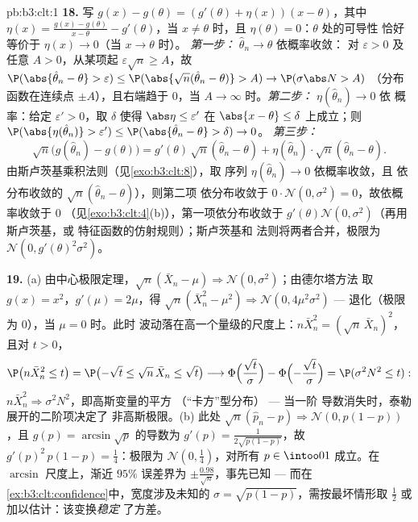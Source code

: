 \begin{solution}{pb:b3:clt:1}
\textbf{18.} 写 $g(x) - g(\theta) = (g'(\theta) +
\eta(x))(x - \theta)$，其中 $\eta(x) = \frac{g(x) -
g(\theta)}{x - \theta} - g'(\theta)$，当 $x \neq \theta$
时，且 $\eta(\theta) = 0$：$\theta$ 处的可导性
恰好等价于 $\eta(x) \to 0$（当 $x \to \theta$ 时）。
\emph{第一步：} $\hat\theta_n \to \theta$ 依概率收敛：
对 $\varepsilon > 0$ 及任意 $A > 0$，从某项起
$\varepsilon\sqrt n \geq A$，故 $\P(\abs{\hat\theta_n -
\theta} > \varepsilon) \leq \P(\abs{\sqrt
n(\hat\theta_n - \theta)} > A) \to \P(\sigma\abs N > A)$
（分布函数在连续点
$\pm A$），且右端趋于 $0$，当 $A \to
\infty$ 时。\emph{第二步：} $\eta(\hat\theta_n) \to 0$ 依
概率：给定 $\varepsilon' > 0$，取 $\delta$ 使得
$\abs\eta \leq \varepsilon'$ 在 $\abs{x - \theta} \leq
\delta$ 上成立；则 $\P(\abs{\eta(\hat\theta_n)} > \varepsilon')
\leq \P(\abs{\hat\theta_n - \theta} > \delta) \to 0$。
\emph{第三步：}
\[
\sqrt n\bigl(g(\hat\theta_n) - g(\theta)\bigr) =
g'(\theta)\,\sqrt n(\hat\theta_n - \theta) +
\eta(\hat\theta_n)\cdot\sqrt n(\hat\theta_n - \theta) .
\]
由斯卢茨基乘积法则（见\cref{exo:b3:clt:8}），取
序列 $\eta(\hat\theta_n) \to 0$ 依概率收敛，且
依分布收敛的 $\sqrt n(\hat\theta_n - \theta)$），则第二项
依分布收敛于 $0\cdot\mathcal N(0,
\sigma^2) = 0$，故依概率收敛于 $0$
（见\cref{exo:b3:clt:4}(b)），第一项依分布收敛于
$g'(\theta)\mathcal N(0, \sigma^2)$（再用斯卢茨基，或
特征函数的仿射规则）；斯卢茨基和
法则将两者合并，极限为 $\mathcal N(0,
g'(\theta)^2\sigma^2)$。

\textbf{19.} (a) 由中心极限定理，$\sqrt n(\bar X_n - \mu)
\Rightarrow \mathcal N(0, \sigma^2)$；由德尔塔方法
取 $g(x) = x^2$，$g'(\mu) = 2\mu$，得 $\sqrt n(\bar
X_n^2 - \mu^2) \Rightarrow \mathcal N(0, 4\mu^2\sigma^2)$
--- 退化（极限为 $0$），当 $\mu = 0$ 时。此时
波动落在高一个量级的尺度上：$n\bar X_n^2 =
(\sqrt n\,\bar X_n)^2$，且对 $t > 0$，
\[
\P\bigl(n\bar X_n^2 \leq t\bigr) = \P\bigl(-\sqrt t \leq
\sqrt n\,\bar X_n \leq \sqrt t\bigr) \longrightarrow
\Phi\Bigl(\frac{\sqrt t}\sigma\Bigr) -
\Phi\Bigl(-\frac{\sqrt t}\sigma\Bigr) = \P(\sigma^2N^2
\leq t) :
\]
$n\bar X_n^2 \Rightarrow \sigma^2N^2$，即高斯变量的平方
（“卡方”型分布） --- 当一阶
导数消失时，泰勒展开的二阶项决定了
非高斯极限。(b) 此处 $\sqrt n(\hat p_n - p)
\Rightarrow \mathcal N(0, p(1 - p))$，且 $g(p) =
\arcsin\sqrt p$ 的导数为 $g'(p) = \frac1{2\sqrt{p(1 - p)}}$，故
$g'(p)^2\,p(1 - p) = \frac14$：极限为 $\mathcal
N(0, \frac14)$，对所有 $p \in \intoo01$ 成立。在
$\arcsin$ 尺度上，渐近 $95\%$ 误差界为 $\pm
\frac{0.98}{\sqrt n}$，事先已知 --- 而在
\cref{ex:b3:clt:confidence}中，宽度涉及未知的
$\sigma = \sqrt{p(1-p)}$，需按最坏情形取 $\frac12$
或加以估计：该变换\emph{稳定}
了方差。


\end{solution}
